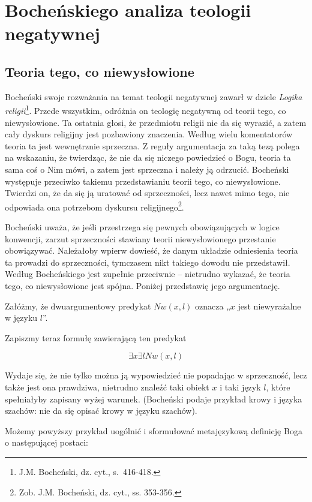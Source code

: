 \clearpage
\section{Bocheńskiego analiza teologii negatywnej}
\subsection{Teoria tego, co niewysłowione}
Bocheński swoje rozważania na temat teologii negatywnej zawarł w dziele
\textit{Logika religii}\footnote{J.M. Bocheński, dz. cyt., s.~416-418.
 }. Przede wszystkim, odróżnia on teologię negatywną od teorii
tego, co niewysłowione. Ta ostatnia głosi, że przedmiotu religii nie da
się wyrazić, a zatem cały dyskurs religijny jest pozbawiony znaczenia.
Według wielu komentatorów teoria ta jest wewnętrznie sprzeczna. Z
reguły argumentacja za taką tezą polega na wskazaniu, że twierdząc, że
nie da się niczego powiedzieć o Bogu, teoria ta sama coś o Nim mówi, a
zatem jest sprzeczna i należy ją odrzucić. Bocheński występuje
przeciwko takiemu przedstawianiu teorii tego, co niewysłowione.
Twierdzi on, że da się ją uratować od sprzeczności, lecz nawet mimo
tego, nie odpowiada ona potrzebom dyskursu religijnego\footnote{Zob.
J.M. Bocheński, dz. cyt., ss. 353-356. }.

Bocheński uważa, że jeśli przestrzega się pewnych obowiązujących w
logice konwencji, zarzut sprzeczności stawiany teorii niewysłowionego
przestanie obowiązywać. Należałoby wpierw dowieść, że danym układzie
odniesienia teoria ta prowadzi do sprzeczności, tymczasem nikt takiego
dowodu nie przedstawił. Według Bocheńskiego jest zupełnie przeciwnie –
nietrudno wykazać, że teoria tego, co niewysłowione jest spójna.
Poniżej przedstawię jego argumentację.

Załóżmy, że dwuargumentowy predykat  $Nw(x,l)$ oznacza „$x$ jest
niewyrażalne w języku $l$”.

Zapiszmy teraz formułę zawierającą ten predykat

\begin{equation}
\exists x \exists l Nw(x, l)
\end{equation}

Wydaje się, że nie tylko można ją wypowiedzieć nie popadając w
sprzeczność, lecz także jest ona prawdziwa, nietrudno znaleźć taki
obiekt $x$ i taki język $l$, które spełniałyby zapisany wyżej warunek.
(Bocheński podaje przykład krowy i języka szachów: nie da się opisać
krowy w języku szachów).

Możemy powyższy przykład uogólnić i sformułować metajęzykową definicję
Boga o następującej postaci:

